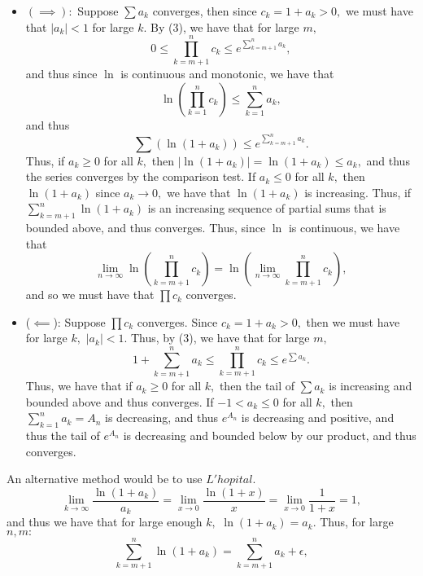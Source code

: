 \documentclass[11pt]{article}
\begin{document}
\begin{solution}
\begin{itemize}
        \item 
        $(\implies):$ Suppose $\sum a_k$ converges, then since $c_k = 1 + a_k >0,$ we must have that $|a_k|<1$ for large $k.$ By (3), we have that for large $m,$
        \[0\leq \prod_{k=m+1}^n c_k \leq e^{\sum_{k=m+1}^n a_k},\] and thus since $\ln$ is continuous and monotonic, we have that
        \[\ln\left(\prod_{k=1}^n c_k\right) \leq {\sum_{k=1}^n a_k},\] and thus \[\sum\left(\ln(1 + a_k)\right) \leq e^{\sum_{k=m+1}^n a_k}.\] Thus, if $a_k \geq 0$ for all $k,$ then $|\ln(1 + a_k)| = \ln(1 + a_k)\leq a_k,$ and thus the series converges by the comparison test. If $a_k\leq 0$ for all $k,$ then $\ln(1+a_k)$ since $a_k \to 0,$ we have that $\ln(1 + a_k)$ is increasing. Thus, if $\sum_{k= m+1}^n\ln(1 + a_k)$ is an increasing sequence of partial sums that is bounded above, and thus converges. Thus, since $\ln$ is continuous, we have that 
        \[\lim_{n\to \infty}\ln\left(\prod_{k=m+1}^n c_k\right) = \ln\left(\lim_{n\to \infty}\prod_{k=m+1}^n c_k\right),\] and so we must have that $\prod c_k$ converges. 
        \item ($\impliedby$): Suppose $\prod c_k$ converges. Since $c_k = 1 + a_k>0,$ then we must have for large $k,$ $|a_k|<1.$ Thus, by (3), we have that for large $m,$
        \[1 + \sum_{k=m+1}^n a_k \leq \prod_{k=m+1}^n c_k \leq e^{\sum a_k}.\] Thus, we have that if $a_k\geq 0$ for all $k,$ then the tail of $\sum a_k$ is increasing and bounded above and thus converges. If $-1<a_k \leq 0$ for all $k,$ then $\sum_{k=1}^n a_k = A_n$ is decreasing, and thus $e^{A_n}$ is decreasing and positive, and thus the tail of $e^{A_n}$ is decreasing and bounded below by our product, and thus converges.
    \end{itemize}
\end{solution}
\begin{reflection}
    An alternative method would be to use $L'hopital.$ \[\lim_{k \to \infty}\frac{\ln(1 + a_k)}{a_k} = \lim_{x\to 0}\frac{\ln(1+x)}{x} = \lim_{x\to 0}\frac{1}{1+x} = 1,\] and thus we have that for large enough $k,$ $\ln(1+a_k) = a_k.$ Thus, for large $n,m:$
        \[\sum_{k=m+1}^n\ln(1+a_k) = \sum_{k=m+1}^n a_k + 
        \epsilon,\]
\end{reflection}
\end{document}
